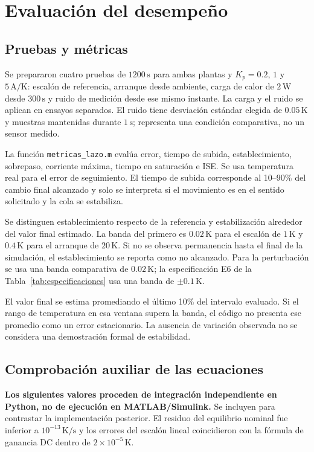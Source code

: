 \section{Evaluación del desempeño}\label{sec:desempenoP}
\subsection{Pruebas y métricas}
Se prepararon cuatro pruebas de $1200\,\mathrm s$ para ambas plantas y $K_p=0.2$, $1$ y $5\,\mathrm{A/K}$: escalón de referencia, arranque desde ambiente, carga de calor de $2\,\mathrm W$ desde $300\,\mathrm s$ y ruido de medición desde ese mismo instante. La carga y el ruido se aplican en ensayos separados. El ruido tiene desviación estándar elegida de $0.05\,\mathrm K$ y muestras mantenidas durante $1\,\mathrm s$; representa una condición comparativa, no un sensor medido.

La función \texttt{metricas\_lazo.m} evalúa error, tiempo de subida, establecimiento, sobrepaso, corriente máxima, tiempo en saturación e ISE. Se usa temperatura real para el error de seguimiento. El tiempo de subida corresponde al 10--90\% del cambio final alcanzado y solo se interpreta si el movimiento es en el sentido solicitado y la cola se estabiliza.

Se distinguen establecimiento respecto de la referencia y estabilización alrededor del valor final estimado. La banda del primero es $0.02\,\mathrm K$ para el escalón de $1\,\mathrm K$ y $0.4\,\mathrm K$ para el arranque de $20\,\mathrm K$. Si no se observa permanencia hasta el final de la simulación, el establecimiento se reporta como no alcanzado. Para la perturbación se usa una banda comparativa de $0.02\,\mathrm K$; la especificación E6 de la Tabla~\ref{tab:especificaciones} usa una banda de $\pm0.1\,\mathrm K$.

El valor final se estima promediando el último 10\% del intervalo evaluado. Si el rango de temperatura en esa ventana supera la banda, el código no presenta ese promedio como un error estacionario. La ausencia de variación observada no se considera una demostración formal de estabilidad.

\subsection{Comprobación auxiliar de las ecuaciones}
\textbf{Los siguientes valores proceden de integración independiente en Python, no de ejecución en MATLAB/Simulink.} Se incluyen para contrastar la implementación posterior. El residuo del equilibrio nominal fue inferior a $10^{-13}\,\mathrm{K/s}$ y los errores del escalón lineal coincidieron con la fórmula de ganancia DC dentro de $2\times10^{-5}\,\mathrm K$.

